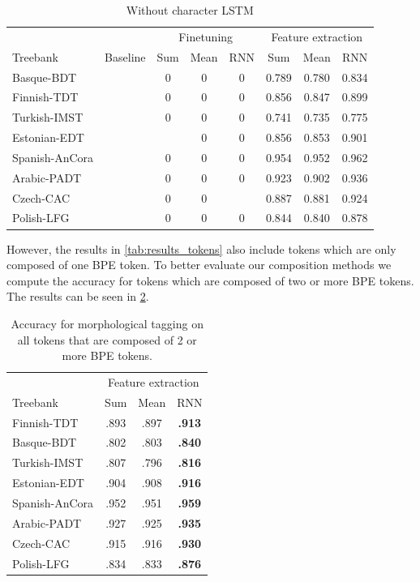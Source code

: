 \documentclass[11pt]{article}
\begin{document}
	\begin{table}[h]
	\centering
	\begin{tabular}{l|c|ccc|ccc}
		& & \multicolumn{3}{c}{Finetuning} & \multicolumn{3}{c}{Feature extraction} \\
		Treebank & Baseline & Sum & Mean & RNN & Sum & Mean & RNN \\
		\hline
		Basque-BDT  &   & 0 & 0 & 0 & 0.789 & 0.780 & 0.834 \\
		Finnish-TDT  &  & 0 & 0 & 0 & 0.856 & 0.847 & 0.899 \\
		Turkish-IMST  &   & 0 & 0 & 0& 0.741 & 0.735 & 0.775 \\
		Estonian-EDT  &   & & 0 & 0 & 0.856 & 0.853 & 0.901 \\
		Spanish-AnCora  &  & 0 & 0 & 0 & 0.954 & 0.952 & 0.962 \\
		Arabic-PADT  & & 0 & 0 & 0  & 0.923 & 0.902 & 0.936 \\
		Czech-CAC  &  & 0 & 0 &  & 0.887 & 0.881 & 0.924 \\
		Polish-LFG  & & 0 & 0 & 0  & 0.844 & 0.840 & 0.878 \\
		
	\end{tabular}
	\caption{\label{tab:results_tokens_nochars} Without character LSTM}
\end{table}

	However, the results in \cref{tab:results_tokens} also include tokens which are only composed of one BPE token. To better evaluate our composition methods we compute the accuracy for tokens which are composed of two or more BPE tokens. The results can be seen in \cref{tab:results_large_tokens}.

	\begin{table}[h]
	\centering
	\begin{tabular}{l|ccc}
		 & \multicolumn{3}{c}{Feature extraction} \\
		Treebank & Sum & Mean & RNN \\
		 \hline
		Finnish-TDT & .893 & .897 & \textbf{.913} \\ 
		Basque-BDT  & .802 & .803 & \textbf{.840} \\
		Turkish-IMST & .807 & .796 & \textbf{.816} \\
		Estonian-EDT & .904 & .908 & \textbf{.916} \\
		Spanish-AnCora & .952 & .951 & \textbf{.959} \\
		Arabic-PADT & .927 & .925 & \textbf{.935}\\
		Czech-CAC & .915 & .916 & \textbf{.930} \\
		Polish-LFG & .834 & .833 & \textbf{.876} \\
	\end{tabular}
	\caption{\label{tab:results_large_tokens} Accuracy for morphological tagging on all tokens that are composed of 2 or more BPE tokens.}
\end{table}
\end{document}
